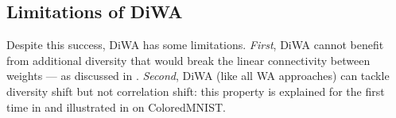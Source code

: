 \subsection{Limitations of DiWA}
\label{subsec:limitations}
Despite this success, DiWA has some limitations.
\textit{First}, DiWA cannot benefit from additional diversity that would break the linear connectivity between weights --- as discussed in .
\textit{Second}, DiWA (like all WA approaches) can tackle diversity shift but not correlation shift: this property is explained for the first time in  and illustrated in  on ColoredMNIST.%
\vspace{-0.2em}%